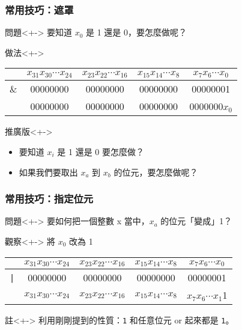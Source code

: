 \documentclass[utf8]{beamer}
\begin{document}
\begin{CJK}{UTF8}{bkai}
\begin{frame}[fragile]
  \frametitle{常用技巧：遮罩}
  \begin{block}{問題}<+->
  要知道 $x_0$ 是 1 還是 0，要怎麼做呢？
  \end{block}
  \begin{exampleblock}{做法}<+->
    \begin{table}[h]
      \begin{tabular}{|c|c|c|c|c|}
      \hline
          & $x_{31}x_{30}\cdots{x_{24}}$ & $x_{23}x_{22}\cdots{x_{16}}$ & $x_{15}x_{14}\cdots{x_{8}}$ & $x_{7}x_{6}\cdots{x_{0}}$\\
      \hline
      $\&$ & 00000000 & 00000000 & 00000000 & 0000000\alert{1}\\
      \hline
      \hline
          & 00000000 & 00000000 & 00000000 & 0000000\alert{$x_0$}\\
      \hline
      \end{tabular}
    \end{table}
  \end{exampleblock}
  \begin{alertblock}{推廣版}<+->
    \begin{itemize}
    \item 要知道 $x_i$ 是 1 還是 0 要怎麼做？
    \item<+-> 如果我們要取出 $x_a$ 到 $x_b$ 的位元，要怎麼做呢？
    \end{itemize}
  \end{alertblock}
\end{frame}

\begin{frame}[fragile]
  \frametitle{常用技巧：指定位元}
  \begin{block}{問題}<+->
  要如何把一個整數 x 當中，$x_a$ 的位元「變成」1？
  \end{block}
  \begin{exampleblock}{觀察}<+->
    將 $x_0$ 改為 1
    \begin{table}[h]
      \begin{tabular}{|c|c|c|c|c|}
      \hline
          & $x_{31}x_{30}\cdots{x_{24}}$ & $x_{23}x_{22}\cdots{x_{16}}$ & $x_{15}x_{14}\cdots{x_{8}}$ & $x_{7}x_{6}\cdots{x_{0}}$\\
      \hline
      \lstinline{|}{} & 00000000 & 00000000 & 00000000 & 0000000\alert{1}\\
      \hline
      \hline
          & $x_{31}x_{30}\cdots{x_{24}}$ & $x_{23}x_{22}\cdots{x_{16}}$ & $x_{15}x_{14}\cdots{x_{8}}$ & $x_{7}x_{6}\cdots{x_{1}}$\alert{1}\\
      \hline
      \end{tabular}
    \end{table}
  \end{exampleblock}
  \begin{alertblock}{註}<+->
  利用剛剛提到的性質：\lstinline{1}{} 和任意位元 or 起來都是 \lstinline{1}{}。
  \end{alertblock}
\end{frame}


\end{CJK}
\end{document}

